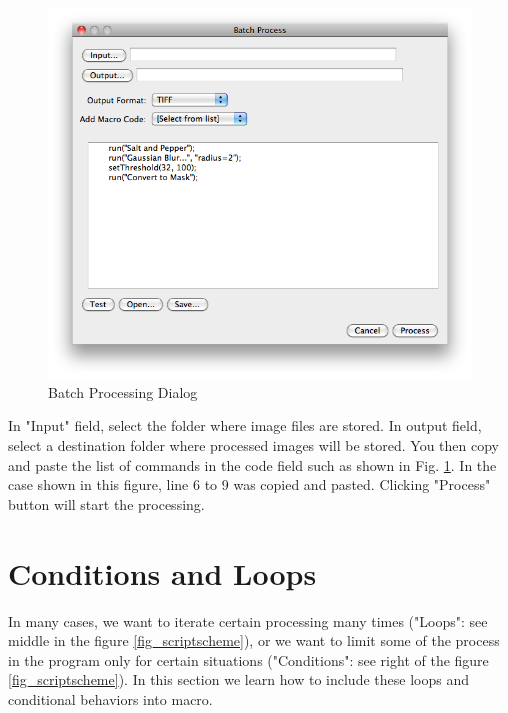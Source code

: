 \documentclass[11pt,a4paper,oneside]{report}
\begin{document}
\begin{figure}[htbp]
\begin{center}
\includegraphics[scale=0.4]{fig/BatchProcessing.png}
\caption{Batch Processing Dialog} \label{fig_BatchProcessInterface}
\end{center}
\end{figure}

In "Input" field, select the folder where image files are stored. In output field, select a destination folder where processed images will be stored. You then copy and paste the list of commands in the code field such as shown in Fig. \ref{fig_BatchProcessInterface}. In the case shown in this figure, line 6 to 9 was copied and pasted. Clicking "Process" button will start the processing.
\newpage

\section{Conditions and Loops}
In many cases, we want to iterate certain processing many times ("Loops": see middle in the figure \ref{fig_scriptscheme}), or we want to limit some of the process in the program only for certain situations ("Conditions": see right of the figure \ref{fig_scriptscheme}). In this section we learn how to include these loops and conditional behaviors into macro. 
\end{document}
